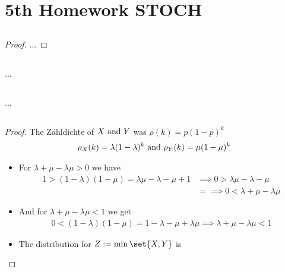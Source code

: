 
\section{5th Homework STOCH}
\subsection{}
\begin{proof}
	...
\end{proof}

\subsection{}
\begin{solution}
	...
\end{solution}
\subsection{}
\begin{solution}
	...
\end{solution}
\subsection{}
\begin{proof}
	The Zähldichte of $X \text{ and } Y$ was $\rho(k) = p(1-p)^k$
	\begin{align*}
		\rho_X(k) = \lambda(1-\lambda)^k \text{ and } \rho_Y (k) = \mu(1-\mu)^k
	\end{align*}
	\begin{itemize}
		\item For $\lambda + \mu -\lambda \mu > 0$ we have
		\begin{align*}
			1 > (1-\lambda)(1-\mu) = \lambda \mu -\lambda -\mu + 1 &\implies 0 > \lambda \mu - \lambda - \mu\\
			&= \implies 0 < \lambda + \mu - \lambda \mu
		\end{align*}
		\item And for $\lambda + \mu - \lambda \mu < 1$ we get
		\begin{align*}
			0 < (1-\lambda)(1-\mu) = 1 - \lambda - \mu + \lambda\mu \implies \lambda + \mu - \lambda \mu < 1
		\end{align*}
		\item The distribution for $Z := \min\set{X,Y}$ is
	\end{itemize}
\end{proof}

